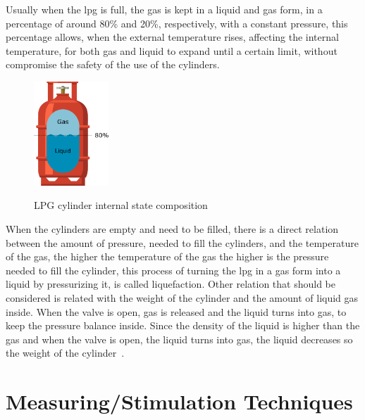 Usually when the \acrshort{lpg} is full, the gas is kept in a liquid and gas form, in a percentage of around 80\% and 20\%, respectively, with a constant pressure, this percentage allows, when the external temperature rises, affecting the internal temperature, for both gas and liquid to expand until a certain limit, without compromise the safety of the use of the cylinders.
\begin{figure}[]
    \centering
    \includegraphics[width=0.25\textwidth]{Chapters/2CHP/Diagrams/bottleBaseliqGas.eps}
    \caption{LPG cylinder internal state composition}{}
    \label{fig:intcomplpg}
\end{figure}

When the cylinders are empty and need to be filled, there is a direct relation between the amount of pressure, needed to fill the cylinders, and the temperature of the gas, the higher the temperature of the gas the higher is the pressure needed to fill the cylinder, this process of turning the \acrshort{lpg} in a gas form into a liquid by pressurizing it, is called liquefaction. 
Other relation that should be considered is related with the weight of the cylinder and the amount of liquid gas inside. When the valve is open, gas is released and the liquid turns into gas, to keep the pressure balance inside. Since the density of the liquid is higher than the gas and when the valve is open, the liquid turns into gas, the liquid decreases so the weight of the cylinder~\cite{WhatAreProperties,PropaneDensitySpecific}.

\section{Measuring/Stimulation Techniques}\label{sec:measStim}
